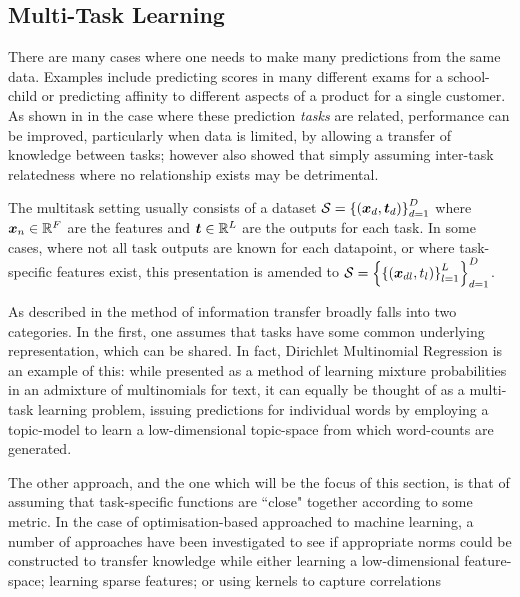 

\subsection{Multi-Task Learning}

There are many cases where one needs to make many predictions from the same data. Examples include predicting scores in many different exams for a school-child\cite{Bonilla2008}\cite{Evgeniou2005} or predicting affinity to different aspects of a product for a single customer\cite{Allenby1999}. As shown in \cite{Caruana1997} in the case where these prediction \emph{tasks} are related, performance can be improved, particularly when data is limited, by allowing a transfer of knowledge between tasks; however \cite{Caruana1997} also showed that simply assuming inter-task relatedness where no relationship exists may be detrimental.

The multitask setting usually consists of a dataset $\mathcal{S} = \left\{\left(\bm x_d, \bm t_d\right)\right\}_{d=1}^D$ where $\bm x_n \in { \mathbb{R}^{F} }$ are the features and $\bm t \in { \mathbb{R}^{L} }$ are the outputs for each task. In some cases, where not all task outputs are known for each datapoint, or where task-specific features exist, this presentation is amended to $\mathcal{S} = \left\{\left\{\left(\bm x_{dl}, t_l\right)\right\}_{l=1}^L\right\}_{d=1}^D$. 

As described in\cite{Argyriou2005} the method of information transfer broadly falls into two categories. In the first, one assumes that tasks have some common underlying representation, which can be shared\cite{Caruana1997}. In fact, Dirichlet Multinomial Regression\cite{Mimno2008} is an example of this: while presented as a method of learning mixture probabilities in an admixture of multinomials for text, it can equally be thought of as a multi-task learning problem, issuing predictions for individual words by employing a topic-model to learn a low-dimensional topic-space from which word-counts are generated. 

The other approach, and the one which will be the focus of this section, is that of assuming that task-specific functions are ``close" together according to some metric. In the case of optimisation-based approached to machine learning, a number of approaches have been investigated to see if appropriate norms could be constructed to transfer knowledge while either learning a low-dimensional feature-space\cite{argyriou2007spectral}; learning sparse features\cite{Argyriou2005}; or using kernels to capture correlations\cite{Evgeniou2005}

